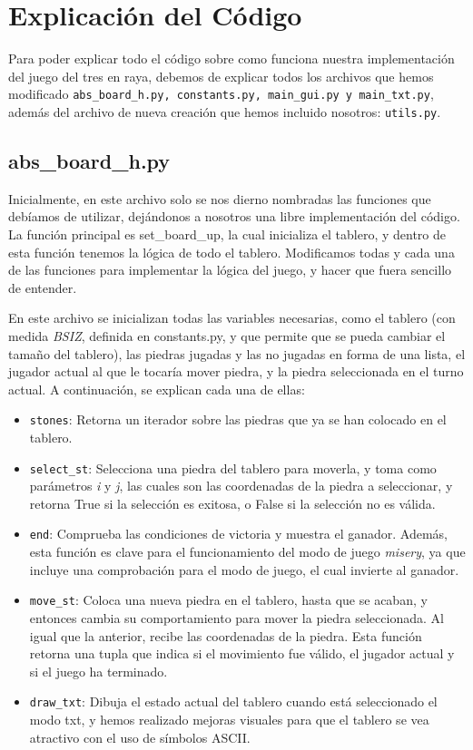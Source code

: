 \documentclass[a4paper,12pt]{article}
\begin{document}
\section{Explicación del Código}
Para poder explicar todo el código sobre como funciona nuestra implementación del juego del tres en raya, debemos de explicar
todos los archivos que hemos modificado \texttt{abs\_board\_h.py, constants.py, main\_gui.py y main\_txt.py}, además del archivo 
de nueva creación que hemos incluido nosotros: \texttt{utils.py}.

\subsection{abs\_board\_h.py}
Inicialmente, en este archivo solo se nos dierno nombradas las funciones que debíamos de utilizar, dejándonos a nosotros una libre 
implementación del código. La función principal es set\_board\_up, la cual inicializa el tablero, y dentro de esta función tenemos la
lógica de todo el tablero. Modificamos todas y cada una de las funciones para implementar la lógica del juego, y hacer que fuera sencillo 
de entender.

\vspace{\baselineskip}
En este archivo se inicializan todas las variables necesarias, como el tablero (con medida \textit{BSIZ}, definida en constants.py,
y que permite que se pueda cambiar el tamaño del tablero), las piedras jugadas y las no jugadas en forma de una lista, el jugador
actual al que le tocaría mover piedra, y la piedra seleccionada en el turno actual.
A continuación, se explican cada una de ellas:

\begin{itemize}
    \item \texttt{stones}: Retorna un iterador sobre las piedras que ya se han colocado en el tablero.
    \item \texttt{select\_st}: Selecciona una piedra del tablero para moverla, y toma como parámetros \textit{i} y \textit{j}, las
    cuales son las coordenadas de la piedra a seleccionar, y retorna True si la selección es exitosa, o False si la selección no es 
    válida.
    \item \texttt{end}: Comprueba las condiciones de victoria y muestra el ganador. Además, esta función es clave para el funcionamiento
    del modo de juego \textit{misery}, ya que incluye una comprobación para el modo de juego, el cual invierte al ganador.
    \item \texttt{move\_st}: Coloca una nueva piedra en el tablero, hasta que se acaban, y entonces cambia su comportamiento para mover la 
    piedra seleccionada. Al igual que la anterior, recibe las coordenadas de la piedra. Esta función retorna una tupla que indica si el movimiento
    fue válido, el jugador actual y si el juego ha terminado.
    \item \texttt{draw\_txt}: Dibuja el estado actual del tablero cuando está seleccionado el modo txt, y hemos realizado mejoras visuales para que 
    el tablero se vea atractivo con el uso de símbolos ASCII.\@
\end{itemize}
\end{document}
